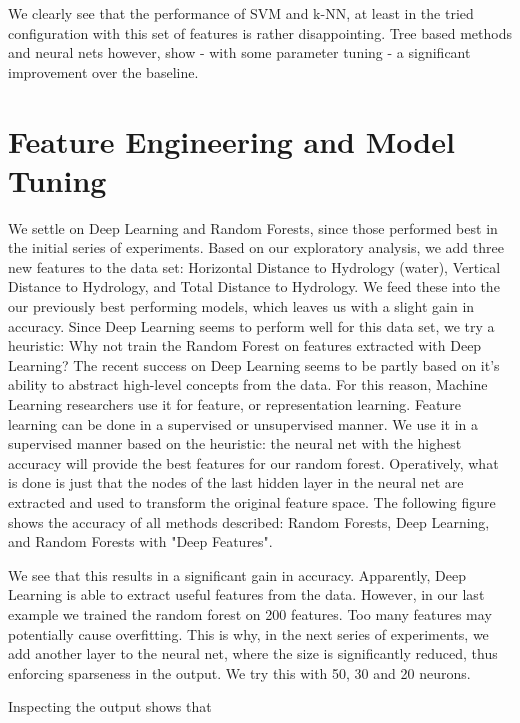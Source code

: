 \documentclass[paper=a4, fontsize=11pt]{scrartcl}
\numberwithin{equation}{section}
\numberwithin{figure}{section}
\numberwithin{table}{section}
\begin{document}
We clearly see that the performance of SVM and k-NN, at least in the tried configuration with this set of features is rather disappointing. Tree based methods  and neural nets however, show - with some parameter tuning - a significant improvement over the baseline. 
 




\section{Feature Engineering and Model Tuning}
We settle on Deep Learning and Random Forests, since those performed best in the initial series of experiments. Based on our exploratory analysis, we add three new features to the data set: Horizontal Distance to Hydrology (water), Vertical Distance to Hydrology, and Total Distance to Hydrology. We feed these into the our previously best performing models, which leaves us with a slight gain in accuracy. 
Since Deep Learning seems to perform well for this data set, we try a heuristic: Why not train the Random Forest on features extracted with Deep Learning? The recent success on Deep Learning seems to be partly based on it's ability to abstract high-level concepts from the data. For this reason, Machine Learning researchers use it for feature, or representation learning. Feature learning can be done in a supervised or unsupervised manner. We use it in a supervised manner based on the heuristic: the neural net with the highest accuracy will provide the best features for our random forest. Operatively, what is done is just that the nodes of the last hidden layer in the neural net are extracted and used to transform the original feature space. The following figure shows the accuracy of all methods described: Random Forests, Deep Learning, and Random Forests with "Deep Features". 


We see that this results in a significant gain in accuracy. Apparently, Deep Learning is able to extract useful features from the data. However, in our last example we trained the random forest on 200 features. Too many features may potentially cause overfitting. This is why, in the next series of experiments, we add another layer to the neural net, where the size is significantly reduced, thus enforcing sparseness in the output. We try this with 50, 30 and 20 neurons. 


Inspecting the output shows that
\end{document}
